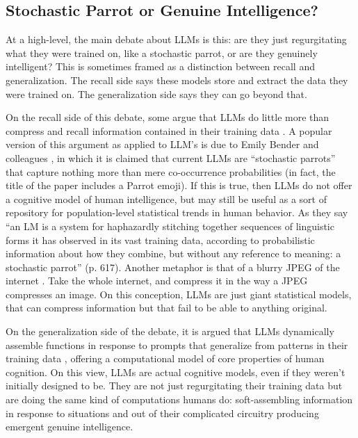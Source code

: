 \subsection{Stochastic Parrot or Genuine Intelligence?}

At a high-level, the main debate about LLMs is this: are they just regurgitating what they were trained on, like a stochastic parrot, or are they genuinely intelligent? This is sometimes framed as a distinction between recall and generalization. The recall side says these models store and extract the data they were trained on. The generalization side says they can go beyond that.

On the recall side of this debate, some argue that LLMs do little more than compress and recall information contained in their training data \cite{bender2021dangers, chiang2023jpeg}.  A popular version of this argument as applied to LLM's is due to Emily Bender and colleagues \cite{bender2021dangers}, in which it is claimed that current LLMs are ``stochastic parrots'' that capture nothing more than mere co-occurrence probabilities (in fact, the title of the paper includes a Parrot emoji).  If this is true, then LLMs do not offer a cognitive model of human intelligence, but may still be useful as a sort of repository for population-level statistical trends in human behavior. As they say ``an LM is a system for haphazardly stitching together sequences of linguistic forms it has observed in its vast training data, according to probabilistic information about how they combine, but without any reference to meaning: a stochastic parrot'' (p. 617).  Another metaphor is that of a blurry JPEG of the internet \cite{chiang2023jpeg}. Take the whole internet, and compress it in the way a JPEG compresses an image.  On this conception, LLMs are just giant statistical models, that can compress information but that fail to be able to anything original.

On the generalization side of the debate, it is argued that LLMs dynamically assemble functions in response to prompts that generalize from patterns in their training data \cite{kello2024emergent}, offering a computational model of core properties of human cognition. On this view, LLMs are actual cognitive models, even if they weren't initially designed to be. They are not just regurgitating their training data but are doing the same kind of computations humans do: soft-assembling information in response to situations and out of their complicated circuitry producing emergent genuine intelligence.

